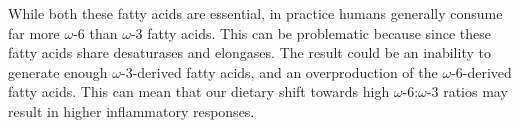 \documentclass{tufte-handout}
\begin{document}
  While both these fatty acids are essential, in practice humans generally consume far more $\omega$-6  than $\omega$-3 fatty acids.  This can be problematic because since these fatty acids share desaturases and elongases.  The result could be an inability to generate enough $\omega$-3-derived fatty acids, and an overproduction of the $\omega$-6-derived fatty acids.  This can mean that our dietary shift towards high $\omega$-6:$\omega$-3 ratios may result in higher inflammatory responses.



\end{document}
